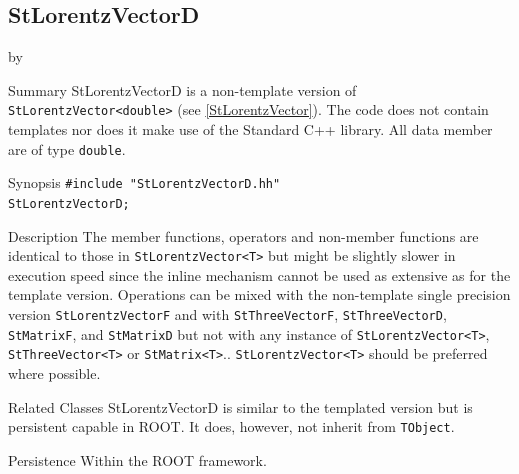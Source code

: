\documentclass[twoside]{article}
\newcommand{\entrylabel}[1]{\mbox{\textbf{{#1}}}\hfil}%
\newenvironment{entry}
{\begin{list}{}%
    {\renewcommand{\makelabel}{\entrylabel}%
     \setlength{\labelwidth}{90pt}%
     \setlength{\leftmargin}{\labelwidth}
     \advance\leftmargin by \labelsep%
      }%
    }%
  {\end{list}}
\newcommand{\Entrylabel}[1]%
{\raisebox{0pt}[1ex][0pt]{\makebox[\labelwidth][l]%
    {\parbox[t]{\labelwidth}{\hspace{0pt}\textbf{{#1}}}}}}
\newenvironment{Entry}%
{\renewcommand{\entrylabel}{\Entrylabel}\begin{entry}}%
  {\end{entry}}
\begin{document}
\subsection{StLorentzVectorD } \label{StLorentzVectorD}
\begin{Entry}
\item[Summary]
    StLorentzVectorD is a non-template version of \verb+StLorentzVector<double>+
    (see \ref{StLorentzVector}). The code does not contain templates nor
    does it make use of the Standard C++ library. All data member are of
    type \texttt{double}.
    
\item[Synopsis]
    \verb+#include "StLorentzVectorD.hh"+ \\
    \verb+StLorentzVectorD;+
    
    
\item[Description]       
    The member functions, operators and non-member functions are identical
    to those in \verb+StLorentzVector<T>+ but might be slightly slower in execution speed
    since the inline mechanism cannot be used as extensive as for the template
    version. Operations can be mixed with the non-template single precision version
    \texttt{StLorentzVectorF} and with \texttt{StThreeVectorF}, \texttt{StThreeVectorD},
    \texttt{StMatrixF}, and \texttt{StMatrixD}
    but not with any instance of \verb+StLorentzVector<T>+, \verb+StThreeVector<T>+ or
    \verb+StMatrix<T>+..
    \verb+StLorentzVector<T>+ should be preferred where possible.

\item[Related Classes]
    StLorentzVectorD is similar to the templated version but
    is persistent capable in ROOT. It does, however, not inherit
    from \texttt{TObject}.
    
\item[Persistence]
    Within the ROOT framework.

\end{Entry}

%
%
\end{document}
